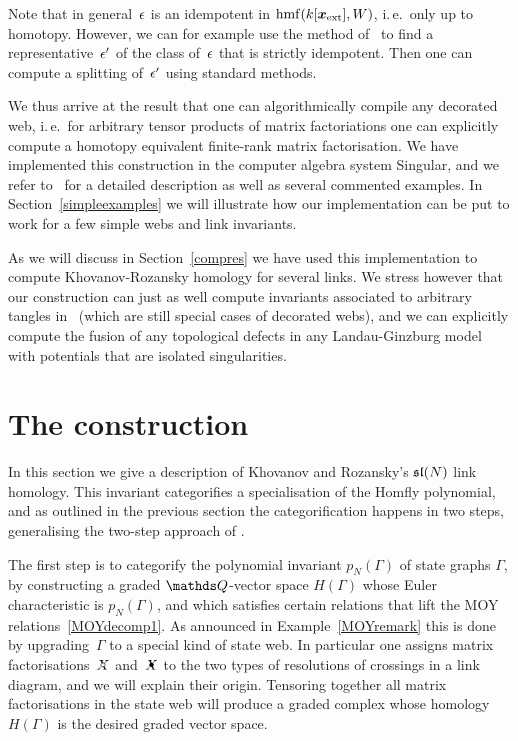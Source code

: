 \documentclass{compositio}
\theoremstyle{definition}
\numberwithin{equation}{section}
\begin{document}
Note that in general~$\epsilon$ is an idempotent in $\operatorname{hmf}(k[\boldsymbol{x}_{\textup{ext}}],W)$, i.\,e.~only up to homotopy. However, we can for example use the method of~\cite[Section~3.6]{LambekRingsModules} to find a representative~$\epsilon'$ of the class of~$\epsilon$ that is strictly idempotent. Then one can compute a splitting of~$\epsilon'$ using standard methods. 

We thus arrive at the result that one can algorithmically compile any decorated web, i.\,e.~for arbitrary tensor products of matrix factoriations one can explicitly compute a homotopy equivalent finite-rank matrix factorisation. We have implemented this construction in the computer algebra system Singular, and we refer to~\cite{cmWebCompileCode} for a detailed description as well as several commented examples. In Section~\ref{simpleexamples} we will illustrate how our implementation can be put to work for a few simple webs and link invariants. 

As we will discuss in Section~\ref{compres} we have used this implementation to compute Khovanov-Rozansky homology for several links. We stress however that our construction can just as well compute invariants associated to arbitrary tangles in~\cite{kr0401268} (which are still special cases of decorated webs), and we can explicitly compute the fusion of any topological defects in any Landau-Ginzburg model with potentials that are isolated singularities.

\section{The construction}
\label{KRconstruction}

In this section we give a description of Khovanov and Rozansky's $\mathfrak{sl}(N)$ link homology. This invariant categorifies a specialisation of the Homfly polynomial, and as outlined in the previous section the categorification happens in two steps, generalising the two-step approach of \cite{moy1998}. 

The first step is to categorify the polynomial invariant $p_N(\Gamma)$ of state graphs $\Gamma$, by constructing a graded $\QQ$-vector space $H(\Gamma)$ whose Euler characteristic is $p_N(\Gamma)$, and which satisfies certain relations that lift the MOY relations~\eqref{MOYdecomp1}. As announced in Example~\ref{MOYremark} this is done by upgrading~$\Gamma$ to a special kind of state web. In particular one assigns matrix factorisations~$\Xcirc$ and~$\Xbul$ to the two types of resolutions of crossings in a link diagram, and we will explain their origin. Tensoring together all matrix factorisations in the state web will produce a graded complex whose homology $H(\Gamma)$ is the desired graded vector space.
\end{document}
